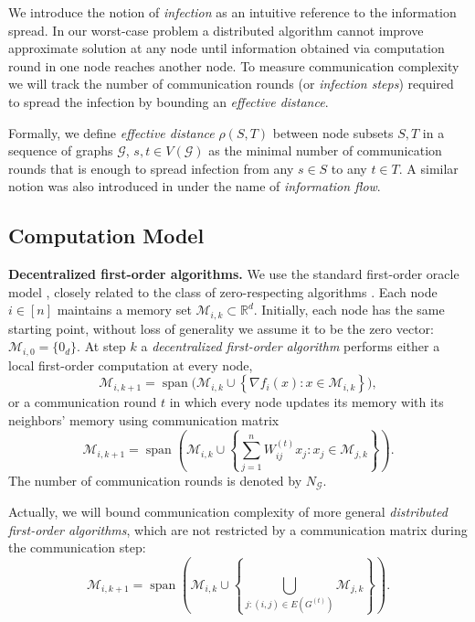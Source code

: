 \documentclass[a4paper,USenglish,cleveref, autoref, thm-restate]{lipics-v2021}
\newcommand{\R}{{\mathbb R}}
\newcommand{\cG}{{\mathcal G}}
\newcommand{\br}[1]{\left\{#1\right\}}
\newcommand{\sumjn}{\sum_{j=1}^{n}}
\begin{document}
\medskip
We introduce the notion of \textit{infection} as an intuitive reference to the information spread. 
In our worst-case problem a distributed algorithm cannot improve approximate solution at any node until information obtained via computation round  in one node reaches another node.
To measure communication complexity we will track the number of communication rounds (or \textit{infection steps}) required to spread the infection by bounding an \textit{effective distance}.

Formally, we define \textit{effective distance} $\rho(S, T)$ between node subsets $S, T$ in a sequence of graphs $\cG$, $s,t \in V(\cG)$ as the minimal number of communication rounds that is enough to spread infection from any $s \in S$ to any $t \in T$.
A similar notion was also introduced  in \cite{metelev2023consensus} under the name of \textit{information flow}.


\subsection{Computation Model}\label{sec:comp-model}
\textbf{Decentralized first-order algorithms.}
We use the standard first-order oracle model \cite{scaman2017optimal}, closely related to the class of zero-respecting algorithms \cite{carmon2020lower}. 
Each node $i\in[n]$ maintains a memory set $\mathcal{M}_{i,k}\subset \R^d$.
Initially, each node has the same starting point, without loss of generality we assume it to be the zero vector: $\mathcal{M}_{i,0}=\{0_d\}$.
At step $k$ a \textit{decentralized first-order algorithm} performs either a local first-order computation at every node,
\begin{equation}\label{eq:local-round}
  \mathcal{M}_{i,k+1}=\operatorname{span}\Big(\mathcal{M}_{i,k}\cup \br{\nabla f_i(x): x\in \mathcal{M}_{i,k}}\Big),
\end{equation}
or a communication round $t$ in which every node updates its memory with its neighbors' memory using communication matrix
\begin{equation}\label{eq:comm-round}
  \mathcal{M}_{i,k+1}=\operatorname{span}\left(\mathcal{M}_{i,k}\cup \br{\sumjn W^{(t)}_{ij}x_j: x_j\in \mathcal{M}_{j,k}}\right).
\end{equation}
The number of communication rounds is denoted by $N_\cG$.

Actually, we will bound communication complexity of more general \textit{distributed first-order algorithms}, which are not restricted by a communication matrix during the communication step:
\begin{equation}\label{eq:comm-round-dist}
  \mathcal{M}_{i,k+1}=\operatorname{span}\left(\mathcal{M}_{i,k}\cup \br{\bigcup_{j : (i,j) \in E(G^{(t)})} \mathcal{M}_{j,k}}\right).
\end{equation}
\end{document}
